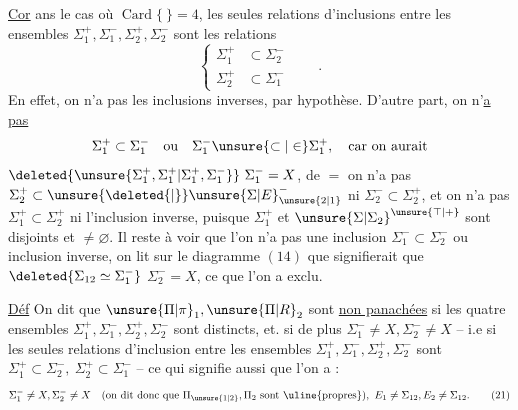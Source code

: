 \begingroup\makeatletter\tagsleft@true\makeatother
\uline{Cor} ans le cas où $\operatorname{Card}\{\ \}=4$,  les seules relations d'inclusions entre les ensembles $\Sigma_1^+,\Sigma_1^-,\Sigma_2^+,\Sigma_2^-$ sont les relations
\[
\left\{\begin{aligned}
\Sigma_1^+&\subset\Sigma_2^-\\
\Sigma_2^+&\subset\Sigma_1^-
\end{aligned}\right.\qquad .
\tag*{($*$)}
\]
En effet, on n'a pas les inclusions inverses, par hypothèse. D'autre part, on n'\uline{a pas}
\[
\Sigma_1^+\subset\Sigma_1^-\quad\text{ou}\quad\Sigma_1^-\unsure{\subset|\in}\Sigma_1^+,\quad\text{car on aurait}
\]
$\deleted{\unsure{\Sigma_1^+,\Sigma_1^+|\Sigma_1^+,\Sigma_1^-}}\ \Sigma_1^-=X$, de $=$ on n'a pas $\Sigma_2^+\subset\unsure{\deleted{\vert}}\unsure{\Sigma|E}_{\unsure{2|1}}^-$ ni $\Sigma_2^-\subset\Sigma_2^+$, et on n'a pas $\Sigma_1^+\subset\Sigma_2^+$ ni l'inclusion inverse, puisque $\Sigma_1^+$ et $\unsure{\Sigma|\Sigma_2}^{\unsure{\top|+}}$ sont disjoints et $\ne\varnothing$. Il reste à voir que l'on n'a pas une inclusion $\Sigma_1^-\subset\Sigma_2^-$ ou inclusion inverse, on lit sur le diagramme $(14)$ que   signifierait que $\deleted{\Sigma_{12}\simeq\Sigma_1^-}$  $\Sigma_2^-=X$, ce que l'on a exclu.

\noindent\makebox[0pt][r]{\rule[-30ex]{.4pt}{31.5ex}\hspace{.55em}}\uline{Déf} On dit que $\unsure{\Pi|\pi}_1,\unsure{\Pi|R}_2$ sont \uline{ non panachées}  si les quatre ensembles $\Sigma_1^+,\Sigma_1^-,\Sigma_2^+,\Sigma_2^-$ sont distincts, et. si  de plus $\Sigma_1^-\ne X,\Sigma_2^-\ne X$ -- i.e si les seules relations d'inclusion entre les ensembles $\Sigma_1^+,\Sigma_1^-,\Sigma_2^+,\Sigma_2^-$ sont $\Sigma_1^+\subset\Sigma_2^-,\ \Sigma_2^+\subset\Sigma_1^-$ -- ce qui signifie aussi que l'on a :
\[
\Sigma_1^-\ne X,\Sigma_2^-\ne X
\quad(\text{on dit donc que }\Pi_{\unsure{1|2}},\Pi_2\text{ sont \uline{propres}}),
\ E_1\ne\Sigma_{12},E_2\ne\Sigma_{12}.
\tag*{(21)}
\]
\endgroup
\clearpage
